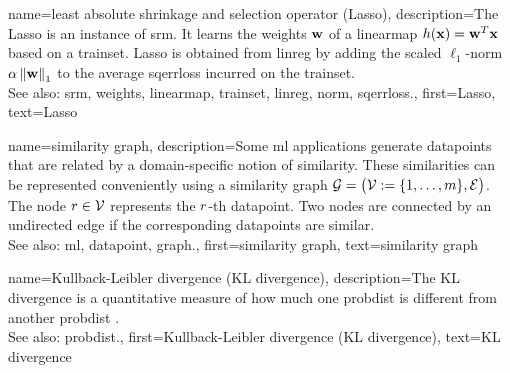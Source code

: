  
 {name={least absolute shrinkage and selection operator (Lasso)}, 
	description={The Lasso is an 
		instance of \gls{srm}. It learns the \gls{weights} ${\bf w}$ of a \gls{linearmap} 
		$h({\bf x}) = {\bf w}^{T} {\bf x}$ based on a \gls{trainset}. 
		Lasso is obtained from \gls{linreg} by adding the scaled $\ell_{1}$-\gls{norm} 
		$\alpha \left\Vert {{\bf w}} \right\Vert_{1}$ to the average \gls{sqerrloss} incurred on the \gls{trainset}. 
				\\
		See also: \gls{srm}, \gls{weights}, \gls{linearmap}, \gls{trainset}, \gls{linreg}, \gls{norm}, \gls{sqerrloss}.},
	first={Lasso},
	text={Lasso} 
}
 
 {name={similarity graph}, 
 	description={Some \gls{ml} applications generate \glspl{datapoint} that 
 		are related by a domain-specific notion of similarity. These similarities can be 
 		represented conveniently using a similarity \gls{graph} $\mathcal{G} = \big(\mathcal{V} := \{1,\ldots,m\},\mathcal{E}\big)$. 
 		The node $r \in \mathcal{V}$ represents the $r$-th \gls{datapoint}. Two 
 		nodes are connected by an undirected edge if the corresponding \glspl{datapoint} are similar. 
				\\
		See also: \gls{ml}, \gls{datapoint}, \gls{graph}.},
 	first={similarity graph},
	text={similarity graph} 
}
 
 
 {name={Kullback-Leibler divergence (KL divergence)}, 
 	description={The KL divergence is a quantitative 
 		 measure of how much one \gls{probdist} is different from another \gls{probdist} \cite{coverthomas}.  
		 		\\
		See also: \gls{probdist}.},
 	first={Kullback-Leibler divergence (KL divergence)},
	text={KL divergence} 
}

